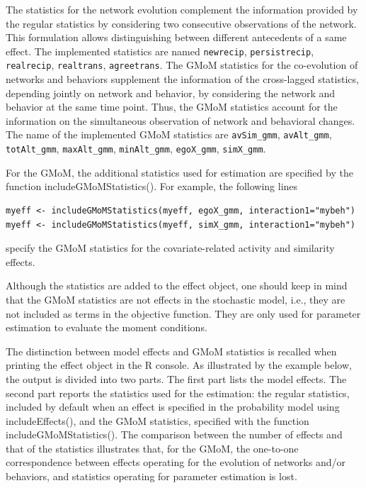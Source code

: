 \documentclass[a4paper,fleqn,11pt]{article}
\newcommand{\+}{\, + \,}
\newcommand{\sfn}[1]{\textsf{#1}}
\begin{document}
The statistics for the network evolution \citep{ASS2015}
complement the information provided by the regular statistics by
considering two consecutive observations of the network.
This formulation allows distinguishing between different antecedents of a same effect.
The implemented statistics are named \texttt{newrecip}, \texttt{persistrecip}, \texttt{realrecip},
\texttt{realtrans}, \texttt{agreetrans}.
The GMoM statistics for the co-evolution of networks and behaviors \citep{ASS2019}
supplement the information of the cross-lagged statistics, depending jointly
on network and behavior, by considering the network and behavior at the same time point.
Thus, the GMoM statistics account for the information on the simultaneous observation
of network and behavioral changes. The name of the implemented GMoM statistics
are \texttt{avSim\_gmm}, \texttt{avAlt\_gmm}, \texttt{totAlt\_gmm}, \texttt{maxAlt\_gmm},
\texttt{minAlt\_gmm}, \texttt{egoX\_gmm}, \texttt{simX\_gmm}.

For the GMoM, the additional statistics used for estimation are specified by
the function \sfn{includeGMoMStatistics()}. For example, the following lines
\begin{verbatim}
myeff <- includeGMoMStatistics(myeff, egoX_gmm, interaction1="mybeh")
myeff <- includeGMoMStatistics(myeff, simX_gmm, interaction1="mybeh")
\end{verbatim}
specify the GMoM statistics for the covariate-related activity and similarity effects.

Although the statistics are added to the effect object,
one should keep in mind that the GMoM statistics are not effects
in the stochastic model, i.e., they are not
included as terms in the objective function.
They are only used for parameter estimation to evaluate the moment conditions.

The distinction between model effects
and GMoM statistics is recalled when printing the effect object in the R console.
As illustrated by the example below, the output is divided into two parts.
The first part lists the model effects.
The second part reports the statistics used for the estimation:
the regular statistics, included by default when an effect is specified
in the probability model using \sfn{includeEffects()},
and the GMoM statistics, specified with the function \sfn{includeGMoMStatistics()}.
The comparison between the number of effects and that of the statistics
illustrates that, for the GMoM, the one-to-one correspondence
between effects operating for the evolution of networks and/or behaviors,
and statistics operating for parameter estimation is lost.
\end{document}
